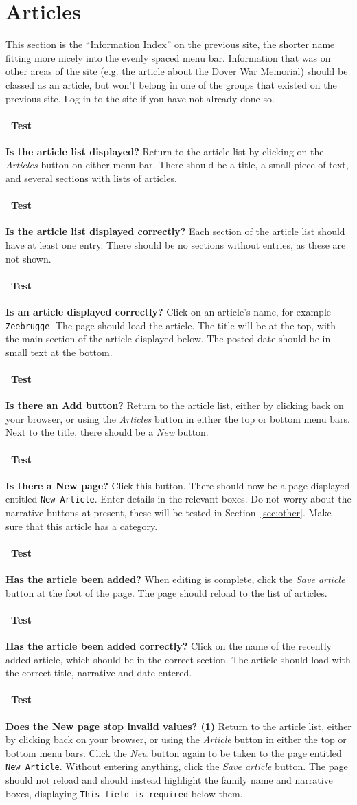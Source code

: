 \documentclass[12pt]{article}
\newcounter{Test}
\newcommand{\test}[1]{%
\stepcounter{Test}%
\paragraph{\Circle\ Test \theTest} \textbf{#1} }
\begin{document}
\section{Articles}\label{sec:article}
This section is the ``Information Index'' on the previous site, the shorter name fitting more nicely into the evenly spaced menu bar. Information that was on other areas of the site (e.g. the article about the Dover War Memorial) should be classed as an article, but won't belong in one of the groups that existed on the previous site. Log in to the site if you have not already done so.

\test{Is the article list displayed?}
Return to the article list by clicking on the \textit{Articles} button on either menu bar. There should be a title, a small piece of text, and several sections with lists of articles.

\test{Is the article list displayed correctly?}
Each section of the article list should have at least one entry. There should be no sections without entries, as these are not shown.

\test{Is an article displayed correctly?}
Click on an article's name, for example \texttt{Zeebrugge}. The page should load the article. The title will be at the top, with the main section of the article displayed below. The posted date should be in small text at the bottom.

\test{Is there an Add button?}
Return to the article list, either by clicking back on your browser, or using the \textit{Articles} button in either the top or bottom menu bars. Next to the title, there should be a \textit{New} button.

\test{Is there a New page?}
Click this button. There should now be a page displayed entitled \texttt{New Article}. Enter details in the relevant boxes. Do not worry about the narrative buttons at present, these will be tested in Section~\ref{sec:other}. Make sure that this article has a category.

\test{Has the article been added?}
When editing is complete, click the \textit{Save article} button at the foot of the page. The page should reload to the list of articles.

\test{Has the article been added correctly?}
Click on the name of the recently added article, which should be in the correct section. The article should load with the correct title, narrative and date entered.

\test{Does the New page stop invalid values? (1)}
Return to the article list, either by clicking back on your browser, or using the \textit{Article} button in either the top or bottom menu bars. Click the \textit{New} button again to be taken to the page entitled \texttt{New Article}. Without entering anything, click the \textit{Save article} button. The page should not reload and should instead highlight the family name and narrative boxes, displaying \texttt{This field is required} below them.
\end{document}
